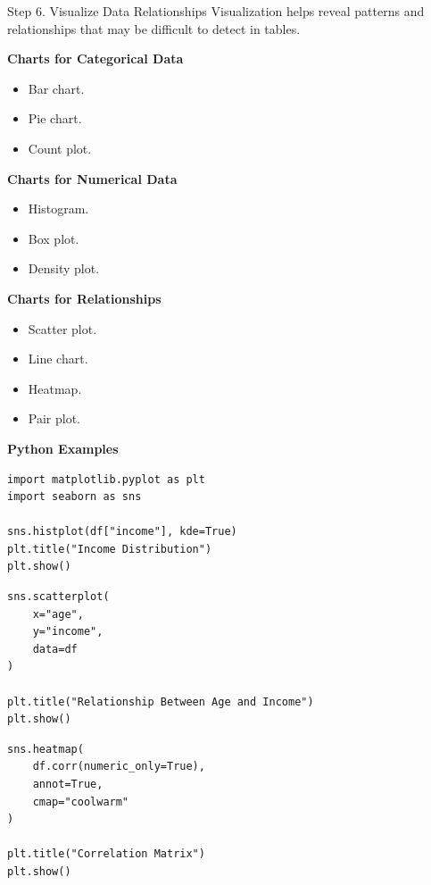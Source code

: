 \documentclass[aspectratio=169,11pt]{beamer}
\begin{document}
\begin{frame}{Step 6. Visualize Data Relationships}
\footnotesize
Visualization helps reveal patterns and relationships that may be difficult to detect in tables.\par\medskip
\textbf{Charts for Categorical Data}\par\medskip
\begin{itemize}
\item Bar chart.
\item Pie chart.
\item Count plot.
\end{itemize}
\textbf{Charts for Numerical Data}\par\medskip
\begin{itemize}
\item Histogram.
\item Box plot.
\item Density plot.
\end{itemize}
\textbf{Charts for Relationships}\par\medskip
\begin{itemize}
\item Scatter plot.
\item Line chart.
\item Heatmap.
\item Pair plot.
\end{itemize}
\textbf{Python Examples}\par\medskip
\begin{lstlisting}[style=py]
import matplotlib.pyplot as plt
import seaborn as sns

sns.histplot(df["income"], kde=True)
plt.title("Income Distribution")
plt.show()
\end{lstlisting}
\begin{lstlisting}[style=py]
sns.scatterplot(
    x="age",
    y="income",
    data=df
)

plt.title("Relationship Between Age and Income")
plt.show()
\end{lstlisting}
\begin{lstlisting}[style=py]
sns.heatmap(
    df.corr(numeric_only=True),
    annot=True,
    cmap="coolwarm"
)

plt.title("Correlation Matrix")
plt.show()
\end{lstlisting}
\end{frame}
\end{document}
